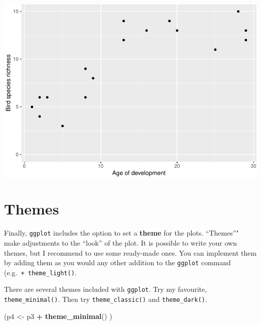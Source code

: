 \documentclass[
  a4paperpaper,
]{book}
\newenvironment{Shaded}{\begin{snugshade}}{\end{snugshade}}
\newcommand{\KeywordTok}[1]{\textcolor[rgb]{0.13,0.29,0.53}{\textbf{#1}}}
\newcommand{\NormalTok}[1]{#1}
\newcommand{\OperatorTok}[1]{\textcolor[rgb]{0.81,0.36,0.00}{\textbf{#1}}}
\newcommand{\StringTok}[1]{\textcolor[rgb]{0.31,0.60,0.02}{#1}}
\begin{document}
\begin{center}\includegraphics{BB852_files/figure-latex/unnamed-chunk-121-1} \end{center}

\hypertarget{themes}{%
\section{Themes}\label{themes}}

Finally, \texttt{ggplot} includes the option to set a \textbf{theme} for the plots. ``Themes''" make adjustments to the ``look'' of the plot. It is possible to write your own themes, but I recommend to use some ready-made ones. You can implement them by adding them as you would any other addition to the \texttt{ggplot} command (e.g.~\texttt{+\ theme\_light()}.

There are several themes included with \texttt{ggplot}. Try my favourite, \texttt{theme\_minimal()}. Then try \texttt{theme\_classic()} and \texttt{theme\_dark()}.

\begin{Shaded}
\begin{Highlighting}[]
\NormalTok{(p4 \textless{}{-}}\StringTok{ }\NormalTok{p3 }\OperatorTok{+}\StringTok{ }
\StringTok{  }\KeywordTok{theme\_minimal}\NormalTok{()}
\NormalTok{)}
\end{Highlighting}
\end{Shaded}
\end{document}
